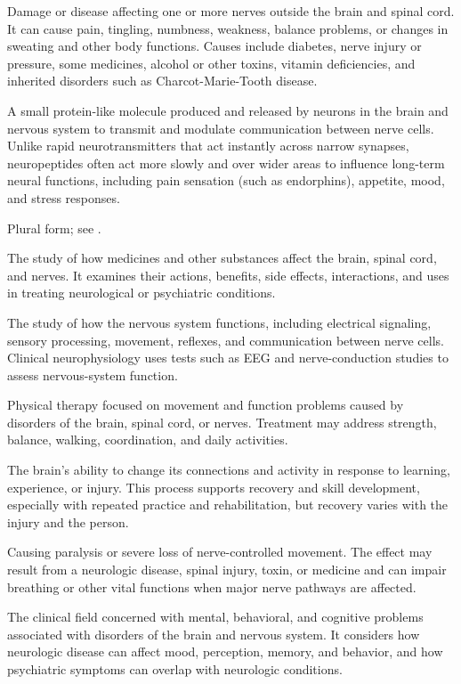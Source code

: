  Damage or disease affecting one or more nerves outside the brain and spinal cord. It can cause pain, tingling, numbness, weakness, balance problems, or changes in sweating and other body functions. Causes include diabetes, nerve injury or pressure, some medicines, alcohol or other toxins, vitamin deficiencies, and inherited disorders such as Charcot-Marie-Tooth disease.

 A small protein-like molecule produced and released by neurons in the brain and nervous system to transmit and modulate communication between nerve cells. Unlike rapid neurotransmitters that act instantly across narrow synapses, neuropeptides often act more slowly and over wider areas to influence long-term neural functions, including pain sensation (such as endorphins), appetite, mood, and stress responses.

 Plural form; see .

 The study of how medicines and other substances affect the brain, spinal cord, and nerves. It examines their actions, benefits, side effects, interactions, and uses in treating neurological or psychiatric conditions.

 The study of how the nervous system functions, including electrical signaling, sensory processing, movement, reflexes, and communication between nerve cells. Clinical neurophysiology uses tests such as EEG and nerve-conduction studies to assess nervous-system function.

 Physical therapy focused on movement and function problems caused by disorders of the brain, spinal cord, or nerves. Treatment may address strength, balance, walking, coordination, and daily activities.

 The brain’s ability to change its connections and activity in response to learning, experience, or injury. This process supports recovery and skill development, especially with repeated practice and rehabilitation, but recovery varies with the injury and the person.

 Causing paralysis or severe loss of nerve-controlled movement. The effect may result from a neurologic disease, spinal injury, toxin, or medicine and can impair breathing or other vital functions when major nerve pathways are affected.

 The clinical field concerned with mental, behavioral, and cognitive problems associated with disorders of the brain and nervous system. It considers how neurologic disease can affect mood, perception, memory, and behavior, and how psychiatric symptoms can overlap with neurologic conditions.

